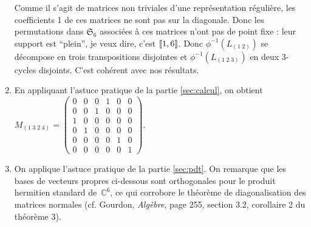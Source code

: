\documentclass[10pt,a4paper,french,landscape]{article}
\DeclarePairedDelimiter\bracketlong{\llbracket}{\rrbracket}
\newcommand{\br}[1]{\bracketlong*{#1}}
\theoremstyle{definition}
\theoremstyle{remark}
\newcommand{\CC}{\mathbb C}
\newcommand{\Sy}{\mathfrak{S}}
\newcommand{\1}{\mathbbm{1}}
\newcommand{\Sn}[1][n]{\Sy_{#1}}
\begin{document}
\begin{multicols*}{2}
\begin{enumerate}
Comme il s'agit de matrices non triviales d'une représentation régulière, les coefficients 1 de ces matrices ne sont pas sur la diagonale. Donc les permutations dans $\Sn[6]$ associées à ces matrices n'ont pas de point fixe : leur support est ``plein'', je veux dire, c'est $\br{1,6}$. Donc $\phi^{-1}(L_{(1\; 2)})$ se décompose en trois transpositions disjointes et $\phi^{-1}(L_{(1\; 2\; 3)})$ en deux 3-cycles disjoints. C'est cohérent avec nos résultats.\medskip

\item En appliquant l'astuce pratique de la partie \ref{sec:calcul}, on obtient\\
$M_{(1\;3\;2\;4)}=
\begin{pmatrix}
 0 & 0 & 0 & 1 & 0 & 0 \\
 0 & 0 & 1 & 0 & 0 & 0 \\
 1 & 0 & 0 & 0 & 0 & 0 \\
 0 & 1 & 0 & 0 & 0 & 0 \\
 0 & 0 & 0 & 0 & 1 & 0 \\
 0 & 0 & 0 & 0 & 0 & 1
\end{pmatrix}$.


\item On applique l'astuce pratique de la partie \ref{sec:pdt}. On remarque que les bases de vecteurs propres ci-dessous sont orthogonales pour le produit hermitien standard de~$\CC^6$, ce qui corrobore le théorème de diagonalisation des matrices normales (cf. Gourdon, \textit{Algèbre}, page 255, section 3.2, corollaire 2 du théorème 3).


\end{enumerate}
\end{multicols*}
\end{document}
